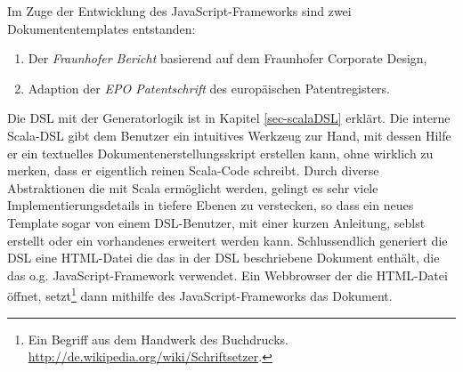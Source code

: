 Im Zuge der Entwicklung des JavaScript-Frameworks sind zwei Dokumententemplates
entstanden:

\begin{enumerate}
  \item Der \emph{Fraunhofer Bericht} basierend auf dem
        Fraunhofer Corporate Design,
  \item Adaption der \emph{EPO Patentschrift} des europäischen Patentregisters.
\end{enumerate}

Die DSL mit der Generatorlogik ist in Kapitel \ref{sec-scalaDSL} erklärt.
Die interne Scala-DSL gibt dem Benutzer ein intuitives Werkzeug zur Hand,
mit dessen Hilfe er ein textuelles Dokumentenerstellungsskript erstellen kann,
ohne wirklich zu merken, dass er eigentlich reinen Scala-Code schreibt.
Durch diverse Abstraktionen die mit Scala ermöglicht werden, gelingt es
sehr viele Implementierungsdetails in tiefere Ebenen zu verstecken, so
dass ein neues Template sogar von einem DSL-Benutzer, mit einer kurzen
Anleitung, seblst erstellt oder ein vorhandenes erweitert werden kann.
Schlussendlich generiert die DSL eine HTML-Datei die das in der DSL
beschriebene Dokument enthält, die das o.g. JavaScript-Framework verwendet.
Ein Webbrowser der die HTML-Datei öffnet, setzt\footnote{
Ein Begriff aus dem Handwerk des Buchdrucks.
\url{http://de.wikipedia.org/wiki/Schriftsetzer}.}
dann mithilfe des JavaScript-Frameworks das Dokument.
